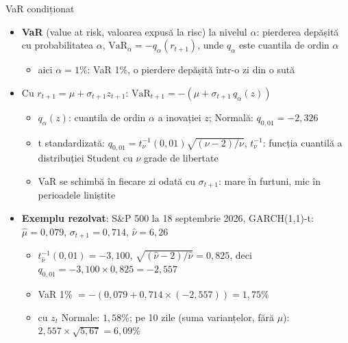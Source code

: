\begin{frame}{VaR condiționat}
\itemsize{\small}
\begin{itemize}
    \item \textbf{VaR} (value at risk, valoarea expusă la risc) la nivelul $\alpha$: pierderea depășită cu probabilitatea $\alpha$, $\mathrm{VaR}_\alpha = -q_\alpha(r_{t+1})$, unde $q_\alpha$ este cuantila de ordin $\alpha$
    \begin{itemize}
        \item aici $\alpha = 1\%$: VaR 1\%, o pierdere depășită într-o zi din o sută
    \end{itemize}
    \item Cu $r_{t+1} = \mu + \sigma_{t+1}z_{t+1}$: $\mathrm{VaR}_{t+1} = -(\mu + \sigma_{t+1}\,q_\alpha(z))$
    \begin{itemize}
        \item $q_\alpha(z)$: cuantila de ordin $\alpha$ a inovației $z$; Normală: $q_{0{,}01} = \ensuremath{-}2{,}326$
        \item t standardizată: $q_{0{,}01} = t_\nu^{-1}(0{,}01)\sqrt{(\nu - 2)/\nu}$, $t_\nu^{-1}$: funcția cuantilă a distribuției Student cu $\nu$ grade de libertate
        \item VaR se schimbă în fiecare zi odată cu $\sigma_{t+1}$: mare în furtuni, mic în perioadele liniștite
    \end{itemize}
    \item \textbf{Exemplu rezolvat}: S\&P 500 la 18 septembrie 2026, GARCH(1,1)-t: $\hat\mu = 0{,}079$, $\sigma_{t+1} = 0{,}714$, $\hat\nu = 6{,}26$
    \begin{itemize}
        \item $t_{\hat\nu}^{-1}(0{,}01) = \ensuremath{-}3{,}100$, $\sqrt{(\hat\nu - 2)/\hat\nu} = 0{,}825$, deci $q_{0{,}01} = \ensuremath{-}3{,}100 \times 0{,}825 = \ensuremath{-}2{,}557$
        \item VaR 1\% $= -(0{,}079 + 0{,}714 \times (\ensuremath{-}2{,}557)) = 1{,}75\%$
        \item cu $z_t$ Normale: $1{,}58\%$; pe 10 zile (suma varianțelor, fără $\mu$): $2{,}557 \times \sqrt{5{,}67} = 6{,}09\%$
    \end{itemize}
\end{itemize}
\end{frame}

